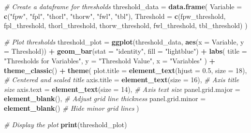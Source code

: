 \documentclass[
]{article}
\newenvironment{Shaded}{\begin{snugshade}}{\end{snugshade}}
\newcommand{\AttributeTok}[1]{\textcolor[rgb]{0.13,0.29,0.53}{#1}}
\newcommand{\CommentTok}[1]{\textcolor[rgb]{0.56,0.35,0.01}{\textit{#1}}}
\newcommand{\DecValTok}[1]{\textcolor[rgb]{0.00,0.00,0.81}{#1}}
\newcommand{\FloatTok}[1]{\textcolor[rgb]{0.00,0.00,0.81}{#1}}
\newcommand{\FunctionTok}[1]{\textcolor[rgb]{0.13,0.29,0.53}{\textbf{#1}}}
\newcommand{\NormalTok}[1]{#1}
\newcommand{\OtherTok}[1]{\textcolor[rgb]{0.56,0.35,0.01}{#1}}
\newcommand{\SpecialCharTok}[1]{\textcolor[rgb]{0.81,0.36,0.00}{\textbf{#1}}}
\newcommand{\StringTok}[1]{\textcolor[rgb]{0.31,0.60,0.02}{#1}}
\begin{document}
\begin{Shaded}
\begin{Highlighting}[]
\CommentTok{\# Create a dataframe for thresholds}
\NormalTok{threshold\_data }\OtherTok{=} \FunctionTok{data.frame}\NormalTok{(}
  \AttributeTok{Variable =} \FunctionTok{c}\NormalTok{(}\StringTok{"fpw"}\NormalTok{, }\StringTok{"fpl"}\NormalTok{, }\StringTok{"thorl"}\NormalTok{, }\StringTok{"thorw"}\NormalTok{, }\StringTok{"fwl"}\NormalTok{, }\StringTok{"tbl"}\NormalTok{),}
  \AttributeTok{Threshold =} \FunctionTok{c}\NormalTok{(fpw\_threshold, fpl\_threshold, thorl\_threshold, thorw\_threshold, fwl\_threshold, tbl\_threshold)}
\NormalTok{)}

\CommentTok{\# Plot thresholds}
\NormalTok{threshold\_plot }\OtherTok{=} \FunctionTok{ggplot}\NormalTok{(threshold\_data, }\FunctionTok{aes}\NormalTok{(}\AttributeTok{x =}\NormalTok{ Variable, }\AttributeTok{y =}\NormalTok{ Threshold)) }\SpecialCharTok{+}
  \FunctionTok{geom\_bar}\NormalTok{(}\AttributeTok{stat =} \StringTok{"identity"}\NormalTok{, }\AttributeTok{fill =} \StringTok{"lightblue"}\NormalTok{) }\SpecialCharTok{+}
  \FunctionTok{labs}\NormalTok{(}
    \AttributeTok{title =} \StringTok{"Thresholds for Variables"}\NormalTok{,}
    \AttributeTok{y =} \StringTok{"Threshold Value"}\NormalTok{,}
    \AttributeTok{x =} \StringTok{"Variables"}
\NormalTok{  ) }\SpecialCharTok{+}
  \FunctionTok{theme\_classic}\NormalTok{() }\SpecialCharTok{+}
  \FunctionTok{theme}\NormalTok{(}
    \AttributeTok{plot.title =} \FunctionTok{element\_text}\NormalTok{(}\AttributeTok{hjust =} \FloatTok{0.5}\NormalTok{, }\AttributeTok{size =} \DecValTok{18}\NormalTok{),  }\CommentTok{\# Centered and scaled title}
    \AttributeTok{axis.title =} \FunctionTok{element\_text}\NormalTok{(}\AttributeTok{size =} \DecValTok{16}\NormalTok{),               }\CommentTok{\# Axis title size}
    \AttributeTok{axis.text =} \FunctionTok{element\_text}\NormalTok{(}\AttributeTok{size =} \DecValTok{14}\NormalTok{),                }\CommentTok{\# Axis text size}
    \AttributeTok{panel.grid.major =} \FunctionTok{element\_blank}\NormalTok{(),        }\CommentTok{\# Adjust grid line thickness}
    \AttributeTok{panel.grid.minor =} \FunctionTok{element\_blank}\NormalTok{()                  }\CommentTok{\# Hide minor grid lines}
\NormalTok{  )}

\CommentTok{\# Display the plot}
\FunctionTok{print}\NormalTok{(threshold\_plot)}
\end{Highlighting}
\end{Shaded}
\end{document}
